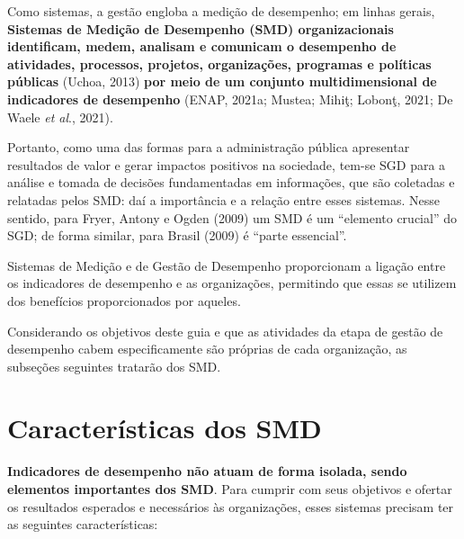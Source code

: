 \documentclass[
  letterpaper,
  DIV=11,
  numbers=noendperiod]{scrreprt}
\begin{document}
Como sistemas, a gestão engloba a medição de desempenho; em linhas
gerais, \textbf{Sistemas de Medição de Desempenho (SMD) organizacionais
identificam, medem, analisam e comunicam o desempenho de atividades,
processos, projetos, organizações, programas e políticas públicas}
(Uchoa, 2013) \textbf{por meio de um conjunto multidimensional de
indicadores de desempenho} (ENAP, 2021a; Mustea; Mihiţ; Lobonţ, 2021; De
Waele \emph{et al}., 2021).

Portanto, como uma das formas para a administração pública apresentar
resultados de valor e gerar impactos positivos na sociedade, tem-se SGD
para a análise e tomada de decisões fundamentadas em informações, que
são coletadas e relatadas pelos SMD: daí a importância e a relação entre
esses sistemas. Nesse sentido, para Fryer, Antony e Ogden (2009) um SMD
é um ``elemento crucial'' do SGD; de forma similar, para Brasil (2009) é
``parte essencial''.

\begin{tcolorbox}[enhanced jigsaw, title=\textcolor{quarto-callout-note-color}{\faInfo}\hspace{0.5em}{Nota}, bottomrule=.15mm, arc=.35mm, bottomtitle=1mm, toprule=.15mm, coltitle=black, opacityback=0, colback=white, rightrule=.15mm, breakable, toptitle=1mm, leftrule=.75mm, titlerule=0mm, opacitybacktitle=0.6, colbacktitle=quarto-callout-note-color!10!white, left=2mm, colframe=quarto-callout-note-color-frame]

Sistemas de Medição e de Gestão de Desempenho proporcionam a ligação
entre os indicadores de desempenho e as organizações, permitindo que
essas se utilizem dos benefícios proporcionados por aqueles.

\end{tcolorbox}

Considerando os objetivos deste guia e que as atividades da etapa de
gestão de desempenho cabem especificamente são próprias de cada
organização, as subseções seguintes tratarão dos SMD.

\hypertarget{caracteruxedsticas-dos-smd}{%
\section{Características dos SMD}\label{caracteruxedsticas-dos-smd}}

\textbf{Indicadores de desempenho não atuam de forma isolada, sendo
elementos importantes dos SMD}. Para cumprir com seus objetivos e
ofertar os resultados esperados e necessários às organizações, esses
sistemas precisam ter as seguintes características:
\end{document}
